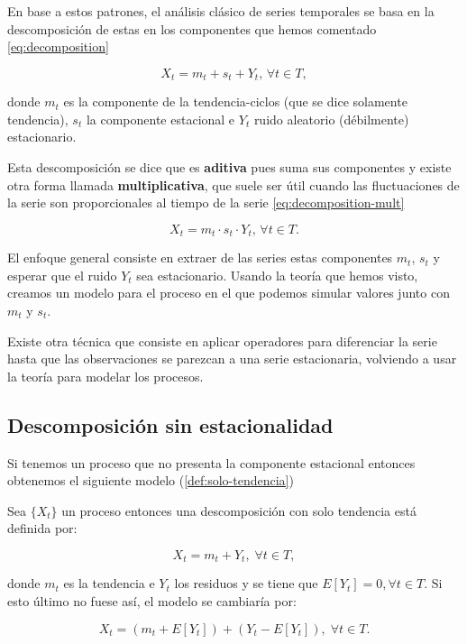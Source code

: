 En base a estos patrones, el análisis clásico de series temporales se basa en la descomposición de estas en los componentes que hemos comentado \eqref{eq:decomposition}

\begin{equation}
  X_t = m_t + s_t + Y_t, \, \forall t \in T,
  \label{eq:decomposition}
\end{equation}

donde $m_t$ es la componente de la tendencia-ciclos (que se dice solamente tendencia), $s_t$ la componente estacional e $Y_t$ ruido aleatorio (débilmente) estacionario.

Esta descomposición se dice que es \textbf{aditiva} pues suma sus componentes y existe otra forma llamada \textbf{multiplicativa}, que suele ser útil cuando las fluctuaciones de la serie son proporcionales al tiempo de la serie \eqref{eq:decomposition-mult}

\begin{equation}
  X_t = m_t \cdot s_t \cdot Y_t, \, \forall t \in T.
  \label{eq:decomposition-mult}
\end{equation}

El enfoque general consiste en extraer de las series estas componentes $m_t$, $s_t$ y esperar que el ruido $Y_t$ sea estacionario. Usando la teoría que hemos visto, creamos un modelo para el proceso en el que podemos simular valores junto con $m_t$ y $s_t$.

Existe otra técnica que consiste en aplicar operadores para diferenciar la serie hasta que las observaciones se parezcan a una serie estacionaria, volviendo a usar la teoría para modelar los procesos.

\subsection{Descomposición sin estacionalidad}

Si tenemos un proceso que no presenta la componente estacional entonces obtenemos el siguiente modelo (\autoref{def:solo-tendencia})

\begin{definicion}
  Sea $\{X_t\}$ un proceso entonces una descomposición con solo tendencia está definida por:

  $$ X_t = m_t + Y_t, \; \forall t \in T,$$

  donde $m_t$ es la tendencia e $Y_t$ los residuos y se tiene que $E[Y_t] = 0, \forall t \in T$. Si esto último no fuese así, el modelo se cambiaría por:

  $$ X_t = (m_t + E[Y_t]) + (Y_t - E[Y_t]), \; \forall t \in T.$$
  \label{def:solo-tendencia}
\end{definicion}

